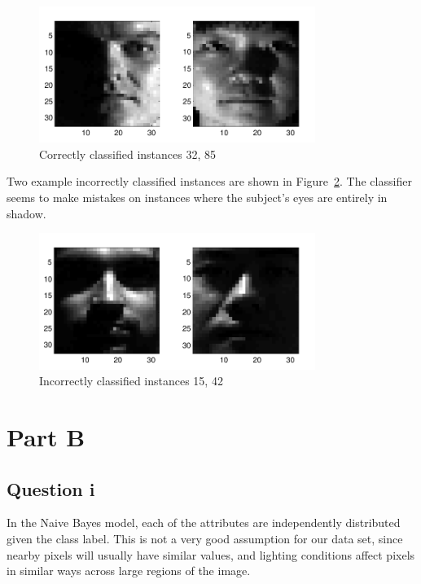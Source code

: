 \documentclass[a4paper]{article}
\begin{document}
\begin{figure}[!htbp]
\centering
\includegraphics[width=0.8\textwidth]{A5-correct-cropped.pdf}
\caption{Correctly classified instances 32, 85}
\label{fig:a5img1}
\end{figure}

Two example incorrectly classified instances are shown in Figure~\ref{fig:a5img2}. The classifier seems to make mistakes on instances where the subject's eyes are entirely in shadow.

\begin{figure}[!htbp]
\centering
\includegraphics[width=0.8\textwidth]{A5-incorrect-cropped.pdf}
\caption{Incorrectly classified instances 15, 42}
\label{fig:a5img2}
\end{figure}

\FloatBarrier

\section*{Part B}
\subsection*{Question i}
In the Naive Bayes model, each of the attributes are independently distributed given the class label. This is not a very good assumption for our data set, since nearby pixels will usually have similar values, and lighting conditions affect pixels in similar ways across large regions of the image.
\end{document}
